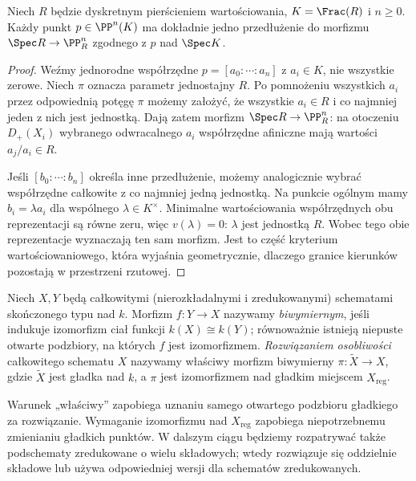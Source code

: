 \begin{stwierdzenie}
\label{st:ga5-valuative-projective}
Niech $R$ będzie dyskretnym pierścieniem wartościowania,
$K=\Frac(R)$ i $n\ge0$. Każdy punkt $p\in\PP^n(K)$
ma dokładnie jedno przedłużenie do morfizmu
$\Spec R\to\PP^n_R$ zgodnego z $p$ nad $\Spec K$.
\end{stwierdzenie}
\begin{proof}
Weźmy jednorodne współrzędne $p=[a_0:\cdots:a_n]$
z $a_i\in K$, nie wszystkie zerowe. Niech $\pi$ oznacza
parametr jednostajny $R$. Po pomnożeniu wszystkich
$a_i$ przez odpowiednią potęgę $\pi$ możemy założyć,
że wszystkie $a_i\in R$ i co najmniej jeden z nich jest
jednostką. Dają zatem morfizm $\Spec R\to\PP^n_R$:
na otoczeniu $D_+(X_i)$ wybranego odwracalnego $a_i$
współrzędne afiniczne mają wartości $a_j/a_i\in R$.

Jeśli $[b_0:\cdots:b_n]$ określa inne przedłużenie,
możemy analogicznie wybrać współrzędne całkowite z
co najmniej jedną jednostką. Na punkcie ogólnym mamy
$b_i=\lambda a_i$ dla wspólnego $\lambda\in K^\times$.
Minimalne wartościowania współrzędnych obu reprezentacji
są równe zeru, więc $v(\lambda)=0$: $\lambda$ jest
jednostką $R$. Wobec tego obie reprezentacje wyznaczają
ten sam morfizm. Jest to część kryterium wartościowaniowego,
która wyjaśnia geometrycznie, dlaczego granice kierunków
pozostają w przestrzeni rzutowej.
\end{proof}

\begin{definicja}
\label{def:ga5-resolution}
Niech $X,Y$ będą całkowitymi (nierozkładalnymi i zredukowanymi)
schematami skończonego typu nad $k$. Morfizm $f:Y\to X$
nazywamy \emph{biwymiernym}, jeśli indukuje izomorfizm ciał
funkcji $k(X)\cong k(Y)$; równoważnie istnieją niepuste
otwarte podzbiory, na których $f$ jest izomorfizmem.
\emph{Rozwiązaniem osobliwości} całkowitego schematu $X$
nazywamy właściwy morfizm biwymierny $\pi:\widetilde X\to X$,
gdzie $\widetilde X$ jest gładka nad $k$, a $\pi$ jest
izomorfizmem nad gładkim miejscem $X_{\mathrm{reg}}$.
\end{definicja}

Warunek „właściwy” zapobiega uznaniu samego otwartego
podzbioru gładkiego za rozwiązanie. Wymaganie izomorfizmu
nad $X_{\mathrm{reg}}$ zapobiega niepotrzebnemu zmienianiu
gładkich punktów. W dalszym ciągu będziemy rozpatrywać
także podschematy zredukowane o wielu składowych;
wtedy rozwiązuje się oddzielnie składowe lub używa
odpowiedniej wersji dla schematów zredukowanych.

